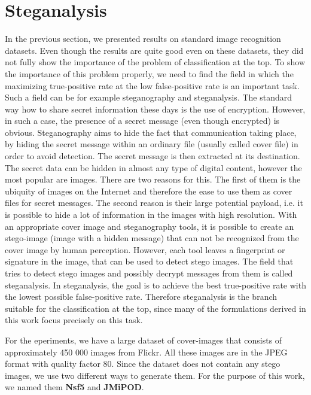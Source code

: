 \newpage

\section{Steganalysis}\label{sec: steganalysis}

In the previous section, we presented results on standard image recognition datasets. Even though the results are quite good even on these datasets, they did not fully show the importance of the problem of classification at the top. To show the importance of this problem properly,  we need to find the field in which the maximizing true-positive rate at the low false-positive rate is an important task. Such a field can be for example steganography and steganalysis. The standard way how to share secret information these days is the use of encryption. However, in such a case, the presence of a secret message (even though encrypted) is obvious. Steganography aims to hide the fact that communication taking place, by hiding the secret message within an ordinary file (usually called cover file) in order to avoid detection. The secret message is then extracted at its destination. The secret data can be hidden in almost any type of digital content, however the most popular are images. There are two reasons for this. The first of them is the ubiquity of images on the Internet and therefore the ease to use them as cover files for secret messages. The second reason is their large potential payload, i.e. it is possible to hide a lot of information in the images with high resolution. With an appropriate cover image and steganography tools, it is possible to create an stego-image (image with a hidden message) that can not be recognized from the cover image by human perception. However, each tool leaves a fingerprint or signature in the image, that can be used to detect stego images. The field that tries to detect stego images and possibly decrypt messages from them is called steganalysis. In steganalysis, the goal is to achieve the best true-positive rate with the lowest possible false-positive rate. Therefore steganalysis is the branch suitable for the classification at the top, since many of the formulations derived in this work focus precisely on this task. \cite{morkel2005overview, silman2001steganography} 

For the eperiments, we have a large dataset of cover-images that consists of approximately 450 000 images from Flickr. All these images are in the JPEG format with quality factor 80. Since the dataset does not contain any stego images, we use two different ways to generate them. For the purpose of this work, we named them \textbf{Nsf5} and \textbf{JMiPOD}.

